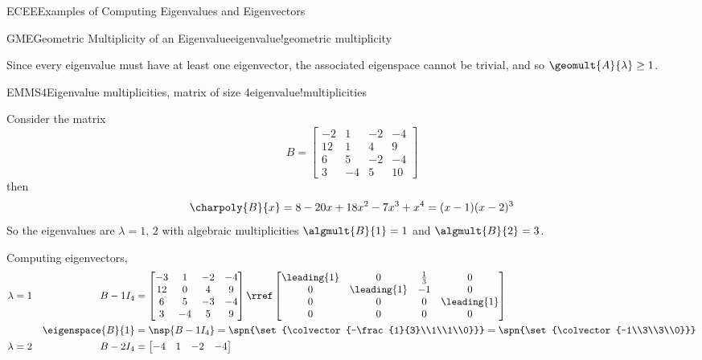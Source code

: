 \begin{subsect}{ECEE}{Examples of Computing Eigenvalues and Eigenvectors}
\begin{definition}{GME}{Geometric Multiplicity of an Eigenvalue}{eigenvalue!geometric multiplicity}
\end{definition}
%
\begin{para}Since every eigenvalue must have at least one eigenvector, the associated eigenspace cannot be trivial, and so $\geomult{A}{\lambda}\geq 1$.\end{para}
%
\begin{example}{EMMS4}{Eigenvalue multiplicities, matrix of size 4}{eigenvalue!multiplicities}
\begin{para}Consider the matrix
%
\begin{equation*}
B=
\begin{bmatrix}
-2 & 1 & -2 & -4\\
12 & 1 & 4 & 9\\
6 & 5 & -2 & -4\\
3 & -4 & 5 & 10
\end{bmatrix}
\end{equation*}
%
then
%
\begin{equation*}
\charpoly{B}{x}=8-20x+18x^2-7x^3+x^4=(x-1)(x-2)^3
\end{equation*}
%
So the eigenvalues are $\lambda=1,\,2$ with algebraic multiplicities $\algmult{B}{1}=1$ and $\algmult{B}{2}=3$.\end{para}
%
\begin{para}Computing eigenvectors,
%
\begin{align*}
\lambda&=1&B- 1I_4&=
\begin{bmatrix}
-3 & 1 & -2 & -4\\
12 & 0 & 4 & 9\\
6 & 5 & -3 & -4\\
3 & -4 & 5 & 9
\end{bmatrix}
\rref
\begin{bmatrix}
\leading{1} & 0 & \frac{1}{3} & 0\\
0 & \leading{1} & -1 & 0\\
0 & 0 & 0 & \leading{1}\\
0 & 0 & 0 & 0
\end{bmatrix}\\
&&\eigenspace{B}{1}&=\nsp{B-1I_4}
=\spn{\set{\colvector{-\frac{1}{3}\\1\\1\\0}}}
=\spn{\set{\colvector{-1\\3\\3\\0}}}\\
%
\lambda&=2&B-2I_4&=
\begin{bmatrix}
-4 & 1 & -2 & -4\\

\end{bmatrix}
\end{align*}
\end{para}
\end{example}
\end{subsect}
